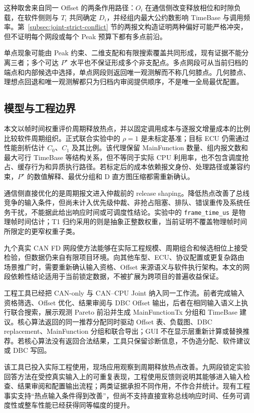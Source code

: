 \documentclass[UTF8,a4paper,twoside,zihao=-4]{ctexart}
\numberwithin{equation}{section}
\numberwithin{figure}{section}
\numberwithin{table}{section}
\theoremstyle{definition}
\numberwithin{algocf}{section}
\begin{document}
这种取舍来自同一 Offset 的两条作用路径：$O_i$ 在通信侧改变释放相位和时隙负载，在软件侧则与 $T_i$ 共同确定 $D_i$，并经组内最大公约数影响 TimeBase 与调用频率。第~\ref{subsec:joint-strict-conflict} 节的两报文构造证明两种偏好可能严格冲突，但不证明每个网段或每个 Peak 预算下都有多点前沿。

单点现象可能由 Peak 约束、二维支配和有限搜索覆盖共同形成，现有证据不能分离三者；多个可达 $P^\star$ 水平也不保证形成多个非支配点。多点网段可从当前归档的端点和内部候选中选择，单点网段则返回唯一观测解而不称几何膝点。几何膝点、理想点回退和唯一观测解都只为归档内审阅提供顺序，不是唯一全局最优配置。

\subsection{模型与工程边界}
\label{subsec:discussion-boundaries}

本文以帧时间权重评价周期释放热点，并以固定调用成本与逐报文增量成本的比例比较软件周期组织。正式联合实验中的 $\rho=1$ 是未标定基准；目标 ECU 仍需通过性能剖析估计 $C_0$、$C_1$ 及其比例。该代理保留 MainFunction 数量、组内报文数和最大可行 TimeBase 等结构关系，但不等同于实际 CPU 利用率，也不包含调度抢占、缓存行为和异质执行路径。若标定后的成本依赖报文身份、处理路径或兼容约束，$P^\star$ 的数值解释、最优分组和 D 直方图压缩都需重新确认。

通信侧直接优化的是周期报文进入仲裁前的 release shaping。降低热点改善了总线竞争的输入条件，但尚未计入优先级仲裁、非抢占阻塞、排队、错误重传及系统任务干扰，不能据此给出响应时间或可调度性结论。实验中的 \texttt{frame\_time\_us} 是物理帧时间估计；T1 归约采用的则是抽象正整数权重，当前证明不覆盖物理帧时间所限定的更窄权重子类。

九个真实 CAN FD 网段使方法能够在实际工程规模、周期组合和候选相位上接受检验，但数据仍来自有限项目环境。向其他车型、ECU、协议配置或更复杂路由场景推广时，需要重新确认输入资格、Offset 来源语义与软件执行架构。本文的网段依赖性结论适用于当前锁定数据，不被扩展为跨项目的普遍收益保证。

工程工具已经把 CAN-only 与 CAN--CPU Joint 纳入同一工作流。前者完成输入资格筛选、Offset 优化、结果审阅与 DBC Offset 输出，后者在相同输入语义上执行联合搜索，展示观测 Pareto 前沿并生成 MainFunctionTx 分组和 TimeBase 建议。核心算法返回的同一推荐分配同时驱动 Offset 表、负载图、DBC replacement、MainFunction 分组和联合导出；GUI 不在显示层重新计算或替换推荐。若核心算法没有返回合法结果，工具只保留诊断信息，不伪造分配、软件建议或 DBC 写回。

该工具已投入实际工程使用，现场应用观察到周期释放热点改善。九网段锁定实验回答方法在受控真实输入上的可重复表现，工程使用反馈则说明其能够进入输入检查、结果审阅和配置输出流程；两类证据承担不同作用，不作合并统计。现有工程事实支持“热点输入条件得到改善”，但尚不支持直接宣称总线响应时间、任务可调度性或整车性能已经获得同等幅度的提升。
\end{document}

